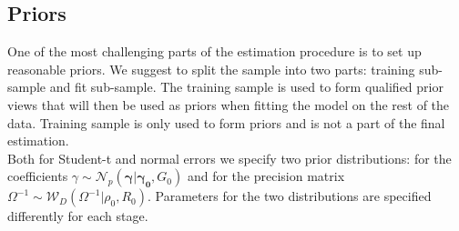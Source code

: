 \documentclass[12pt]{article}
\begin{document}
\subsection{Priors}
One of the most challenging parts of the estimation procedure is to set up reasonable priors. We suggest to split the sample into two parts: training sub-sample and fit sub-sample. The training sample is used to form qualified prior views that will then be used as priors when fitting the model on the rest of the data. Training sample is only used to form priors and is not a part of the final estimation. \\
Both for Student-t and normal errors we specify two prior distributions: for the coefficients $\gamma \sim \mathcal{N}_{p}\left( \boldsymbol{\gamma} |\boldsymbol{\gamma_{0}},G_{0}\right)$ and for the precision matrix $\Omega^{-1} \sim \mathcal{W}_{D}  \left(\Omega ^{-1}|\rho_{0}, R_{0}\right) $. Parameters for the two distributions are specified differently for each stage.
\end{document}
